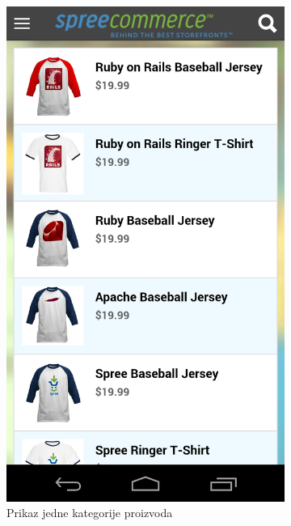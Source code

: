 \begin{figure}[H]
    \begin{subfigure}[b]{0.45\textwidth}
        \centering
        \includegraphics[scale=0.15]{pictures/spreeMobile1}
        \caption{Prikaz jedne kategorije proizvoda}
        \label{fig:spreeMobile1}
    \end{subfigure}
    ~
    \begin{subfigure}[b]{0.45\textwidth}
        \centering

\end{subfigure}
\end{figure}
